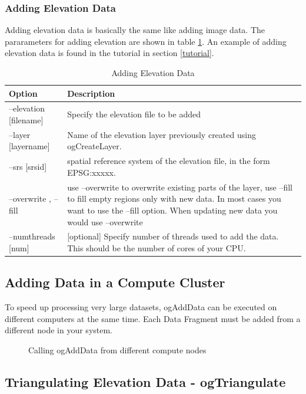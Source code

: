 \documentclass[
	12pt,
	a4paper,
	english,	
	appendixprefix,				     			        
	openany,		     	
	abstracton,		    		    
 	BCOR8mm,		    
]{scrartcl}
\newcommand{\bildhalf}[2]{\begin{figure}[H]
      \centering
      \noindent{\texttt{[image: \#1]}}\caption{#2}
\end{figure}}
\begin{document}
\subsubsection{Adding Elevation Data}

Adding elevation data is basically the same like adding image data. The pararameters for adding elevation are shown in table \ref{tableaddelv}. An example of adding elevation data is found in the tutorial in section \ref{tutorial}.

\begin{table}[H]
\centering
\begin{tabular}{|l|p{6cm}|}
\hline
\textbf{Option}	& \textbf{Description}\\
\hline
--elevation [filename]  & Specify the elevation file to be added\\
\hline
--layer [layername]  & Name of the elevation layer previously created using ogCreateLayer.\\
\hline
--srs [srsid] & spatial reference system of the elevation file, in the form EPSG:xxxxx.\\
\hline
--overwrite , --fill   &  use --overwrite to overwrite existing parts of the layer, use --fill to fill empty regions only with new data. In most cases you want to use the --fill option. When updating new data you would use --overwrite\\
\hline
--numthreads [num] & [optional] Specify number of threads used to add the data. This should be the number of cores of your CPU.\\
\hline
\end{tabular}
\caption{Adding Elevation Data}\label{tableaddelv}
\end{table}

\subsection{Adding Data in a Compute Cluster}

To speed up processing very large datasets, ogAddData can be executed on different computers at the same time. Each Data Fragment must be added from a different node in your system.

\bildhalf{images/cluster.png}{Calling ogAddData from different compute nodes}


\subsection{Triangulating Elevation Data - ogTriangulate}\label{ogTriangulate}
\end{document}
